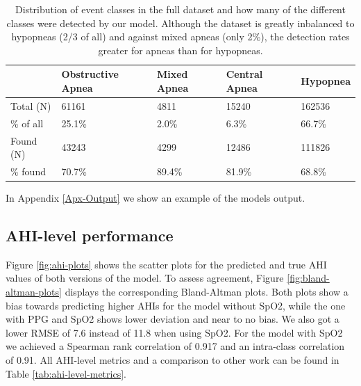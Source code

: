 \renewcommand{\arraystretch}{1.5}
\begin{table}
    \centering
    \begin{tabular}{ l p{2cm} p{2cm} p{2cm} p{2cm} }
        & Obstructive \newline Apnea & Mixed \newline Apnea & Central \newline Apnea & Hypopnea \\
        \hline
        Total (N) & 61161 & 4811 & 15240 & 162536 \\
        \% of all & 25.1\% & 2.0\% & 6.3\%  &  66.7\% \\
        \hline
        Found (N) & 43243 & 4299 & 12486 & 111826 \\
        \% found & 70.7\% & 89.4\% & 81.9\% & 68.8\% \\
    \end{tabular}
    \caption{Distribution of event classes in the full dataset and how many of the different classes were detected by our model. Although the dataset is greatly inbalanced to hypopneas (2/3 of all) and against mixed apneas (only 2\%), the detection rates greater for apneas than for hypopneas. \label{tab:event-class-distribution}}
\end{table}

In Appendix \ref{Apx-Output} we show an example of the models output.

\subsection*{AHI-level performance}

Figure \ref{fig:ahi-plots} shows the scatter plots for the predicted and true AHI values of both versions of the model. To assess agreement, Figure \ref{fig:bland-altman-plots} displays the corresponding Bland-Altman plots. Both plots show a bias towards predicting higher AHIs for the model without SpO2, while the one with PPG and SpO2 shows lower deviation and near to no bias. We also got a lower RMSE of 7.6 instead of 11.8 when using SpO2.
For the model with SpO2 we achieved a Spearman rank correlation of 0.917 and an intra-class correlation of  0.91.
All AHI-level metrics and a comparison to other work can be found in Table \ref{tab:ahi-level-metrics}.

